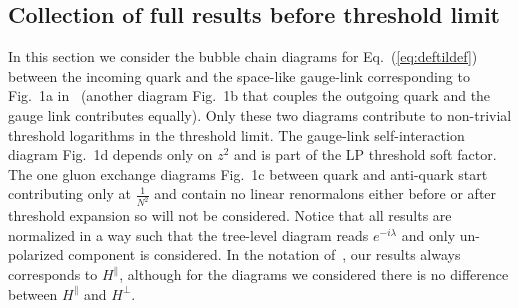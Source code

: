 \documentclass[a4paper,11pt]{article}
\begin{document}
\subsection{Collection of full results before threshold limit}
In this section we consider the bubble chain diagrams for Eq.~(\ref{eq:deftildef}) between the incoming quark and the space-like gauge-link corresponding to Fig.~1a in~\cite{Braun:2018brg} (another diagram Fig.~1b that couples the outgoing quark and the gauge link contributes equally). Only these two diagrams contribute to non-trivial threshold logarithms in the threshold limit. The gauge-link self-interaction diagram Fig.~1d depends only on $z^2$ and is part of the LP threshold soft factor. The one gluon exchange diagrams Fig.~1c between quark and anti-quark start contributing only at $\frac{1}{N^2}$ and contain no linear renormalons either before or after threshold expansion so will not be considered. Notice that all results are normalized in a way such that the tree-level diagram reads $e^{-i\lambda}$ and only un-polarized component is considered. In the notation of~\cite{Braun:2018brg}, our results always corresponds to $H^{\parallel}$, although for the diagrams we considered there is no difference between $H^{\parallel}$ and $H^{\perp}$. 
\end{document}
